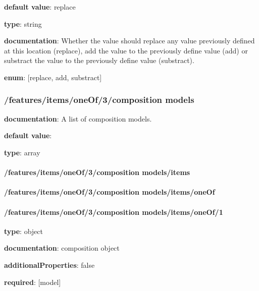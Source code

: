 \begin{itemized}
\item {\bf default value}: replace
\item {\bf type}: string
\item {\bf documentation}: Whether the value should replace any value previously defined at this location (replace), add the value to the previously define value (add) or substract the value to the previously define value (substract).
\item {\bf enum}: [replace, add, substract]\end{itemized}\subsubsection{/features/items/oneOf/3/composition models} \begin{itemized}
\item {\bf documentation}: A list of composition models.
\item {\bf default value}: 
\item {\bf type}: array
\paragraph{/features/items/oneOf/3/composition models/items} \begin{itemized}
\end{itemized}\end{itemized}\paragraph{/features/items/oneOf/3/composition models/items/oneOf} \begin{itemized}
\end{itemized}\paragraph{/features/items/oneOf/3/composition models/items/oneOf/1} \begin{itemized}
\item {\bf type}: object
\item {\bf documentation}: composition object
\item {\bf additionalProperties}: false
\item {\bf required}: [model]\end{itemized}
